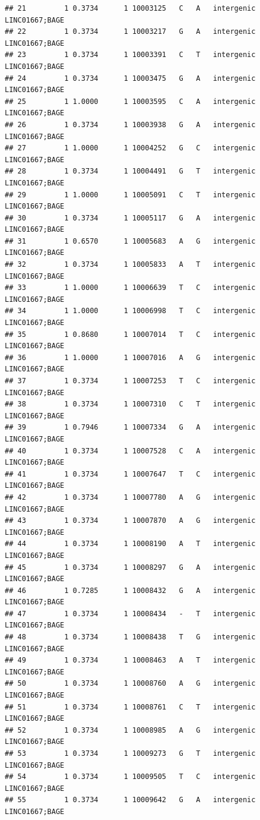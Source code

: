 \documentclass[
]{article}
\begin{document}
\begin{verbatim}
## 21         1 0.3734      1 10003125   C   A   intergenic LINC01667;BAGE
## 22         1 0.3734      1 10003217   G   A   intergenic LINC01667;BAGE
## 23         1 0.3734      1 10003391   C   T   intergenic LINC01667;BAGE
## 24         1 0.3734      1 10003475   G   A   intergenic LINC01667;BAGE
## 25         1 1.0000      1 10003595   C   A   intergenic LINC01667;BAGE
## 26         1 0.3734      1 10003938   G   A   intergenic LINC01667;BAGE
## 27         1 1.0000      1 10004252   G   C   intergenic LINC01667;BAGE
## 28         1 0.3734      1 10004491   G   T   intergenic LINC01667;BAGE
## 29         1 1.0000      1 10005091   C   T   intergenic LINC01667;BAGE
## 30         1 0.3734      1 10005117   G   A   intergenic LINC01667;BAGE
## 31         1 0.6570      1 10005683   A   G   intergenic LINC01667;BAGE
## 32         1 0.3734      1 10005833   A   T   intergenic LINC01667;BAGE
## 33         1 1.0000      1 10006639   T   C   intergenic LINC01667;BAGE
## 34         1 1.0000      1 10006998   T   C   intergenic LINC01667;BAGE
## 35         1 0.8680      1 10007014   T   C   intergenic LINC01667;BAGE
## 36         1 1.0000      1 10007016   A   G   intergenic LINC01667;BAGE
## 37         1 0.3734      1 10007253   T   C   intergenic LINC01667;BAGE
## 38         1 0.3734      1 10007310   C   T   intergenic LINC01667;BAGE
## 39         1 0.7946      1 10007334   G   A   intergenic LINC01667;BAGE
## 40         1 0.3734      1 10007528   C   A   intergenic LINC01667;BAGE
## 41         1 0.3734      1 10007647   T   C   intergenic LINC01667;BAGE
## 42         1 0.3734      1 10007780   A   G   intergenic LINC01667;BAGE
## 43         1 0.3734      1 10007870   A   G   intergenic LINC01667;BAGE
## 44         1 0.3734      1 10008190   A   T   intergenic LINC01667;BAGE
## 45         1 0.3734      1 10008297   G   A   intergenic LINC01667;BAGE
## 46         1 0.7285      1 10008432   G   A   intergenic LINC01667;BAGE
## 47         1 0.3734      1 10008434   -   T   intergenic LINC01667;BAGE
## 48         1 0.3734      1 10008438   T   G   intergenic LINC01667;BAGE
## 49         1 0.3734      1 10008463   A   T   intergenic LINC01667;BAGE
## 50         1 0.3734      1 10008760   A   G   intergenic LINC01667;BAGE
## 51         1 0.3734      1 10008761   C   T   intergenic LINC01667;BAGE
## 52         1 0.3734      1 10008985   A   G   intergenic LINC01667;BAGE
## 53         1 0.3734      1 10009273   G   T   intergenic LINC01667;BAGE
## 54         1 0.3734      1 10009505   T   C   intergenic LINC01667;BAGE
## 55         1 0.3734      1 10009642   G   A   intergenic LINC01667;BAGE

\end{verbatim}
\end{document}
